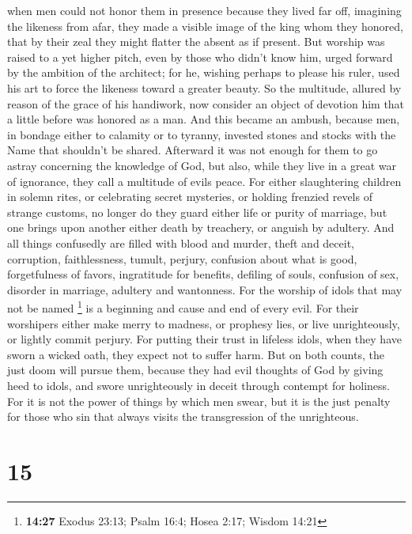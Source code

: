 when men could not honor them in presence because they lived far off,
imagining the likeness from afar, they made a visible image of the king
whom they honored, that by their zeal they might flatter the absent as
if present.  But worship was raised to a yet higher
pitch, even by those who didn't know him, urged forward by the ambition
of the architect;  for he, wishing perhaps to please his
ruler, used his art to force the likeness toward a greater beauty.
 So the multitude, allured by reason of the grace of his
handiwork, now consider an object of devotion him that a little before
was honored as a man.  And this became an ambush, because
men, in bondage either to calamity or to tyranny, invested stones and
stocks with the Name that shouldn't be shared.  Afterward
it was not enough for them to go astray concerning the knowledge of God,
but also, while they live in a great war of ignorance, they call a
multitude of evils peace.  For either slaughtering
children in solemn rites, or celebrating secret mysteries, or holding
frenzied revels of strange customs,  no longer do they
guard either life or purity of marriage, but one brings upon another
either death by treachery, or anguish by adultery.  And
all things confusedly are filled with blood and murder, theft and
deceit, corruption, faithlessness, tumult, perjury, 
confusion about what is good, forgetfulness of favors, ingratitude for
benefits, defiling of souls, confusion of sex, disorder in marriage,
adultery and wantonness.  For the worship of idols that
may not be named \footnote{\textbf{14:27} Exodus 23:13; Psalm 16:4;
  Hosea 2:17; Wisdom 14:21} is a beginning and cause and end of every
evil.  For their worshipers either make merry to madness,
or prophesy lies, or live unrighteously, or lightly commit perjury.
 For putting their trust in lifeless idols, when they
have sworn a wicked oath, they expect not to suffer harm.
 But on both counts, the just doom will pursue them,
because they had evil thoughts of God by giving heed to idols, and swore
unrighteously in deceit through contempt for holiness. 
For it is not the power of things by which men swear, but it is the just
penalty for those who sin that always visits the transgression of the
unrighteous.

\hypertarget{section-14}{%
\section{15}\label{section-14}}

